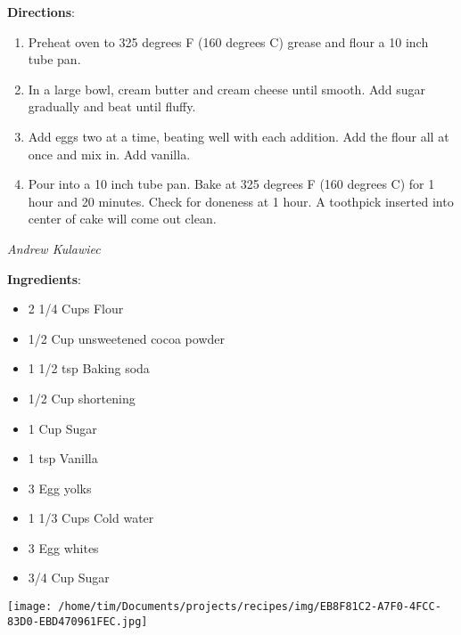 \documentclass[11pt, twoside, openany]{book}
\begin{document}
\textbf{Directions}:
\vspace{-3mm}\begin{enumerate}\setlength\itemsep{-1mm}
\item Preheat oven to 325 degrees F (160 degrees C) grease and flour a 10 inch tube pan.
\item In a large bowl, cream butter and cream cheese until smooth. Add sugar gradually and beat until fluffy.
\item Add eggs two at a time, beating well with each addition. Add the flour all at once and mix in. Add vanilla.
\item Pour into a 10 inch tube pan. Bake at 325 degrees F (160 degrees C) for 1 hour and 20 minutes. Check for doneness at 1 hour. A toothpick inserted into center of cake will come out clean.
\end{enumerate}
 \label{devil's-food-cake}\hfill\textit{Andrew Kulawiec}\\
\begin{minipage}[t]{0.8\linewidth}
\textbf{Ingredients}:\vspace{-3mm}
\begin{multicols}{2}
\begin{itemize}\setlength\itemsep{-1mm}
\item 2 1/4 Cups Flour
\item 1/2 Cup unsweetened cocoa powder
\item 1 1/2 tsp Baking soda
\item 1/2 Cup shortening
\item 1 Cup Sugar
\item 1 tsp Vanilla
\item 3 Egg yolks
\item 1 1/3 Cups Cold water
\item 3 Egg whites
\item 3/4 Cup Sugar
\end{itemize}
\end{multicols}
\end{minipage}
\begin{minipage}[t]{0.2\linewidth}
\centering \strut\vspace*{-\baselineskip}\newline
\texttt{[image: /home/tim/Documents/projects/recipes/img/EB8F81C2-A7F0-4FCC-83D0-EBD470961FEC.jpg]}\\
\end{minipage}\vspace{3mm}
\end{document}
